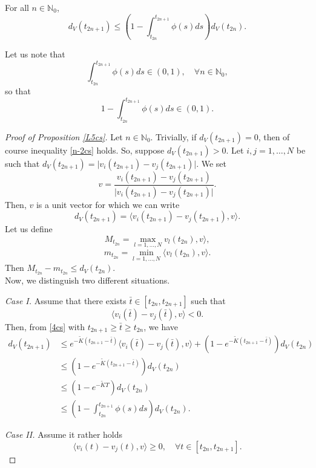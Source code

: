 \documentclass[a4paper,11pt,oneside]{article}
\begin{document}
\begin{prop}\label{L5cs}
	For all $n\in \mathbb{N}_{0}$, 
	\begin{equation}\label{n-2cs}
		d_{V}(t_{2n+1})\leq \left(1-\int_{t_{2n}}^{t_{2n+1}}\phi(s)ds\right)d_{V}(t_{2n}).
	\end{equation}
\end{prop}
\begin{oss}
	Let us note that $$\int_{t_{2n}}^{t_{2n+1}}\phi(s)ds\in (0,1),\quad \forall n\in \mathbb{N}_0,$$
	so that $$1-\int_{t_{2n}}^{t_{2n+1}}\phi(s)ds\in (0,1).$$
\end{oss}
\begin{proof}[Proof of Proposition \ref{L5cs}]
	Let $n\in \mathbb{N}_{0}$. Trivially, if $d_V(t_{2n+1})=0$, then of course inequality \eqref{n-2cs} holds. So, suppose $d_V(t_{2n+1})>0$. Let $i,j=1,\dots,N$ be such that $d_V(t_{2n+1})=\lvert v_{i}(t_{2n+1})-v_{j}(t_{2n+1})\rvert$. We set $$v=\frac{v_{i}(t_{2n+1})-v_{j}(t_{2n+1})}{\lvert v_{i}(t_{2n+1})-v_{j}(t_{2n+1})\rvert}.$$
	Then, $v$ is a unit vector for which we can write $$d_V(t_{2n+1})=\langle v_{i}(t_{2n+1})-v_{j}(t_{2n+1}),v\rangle.$$
	Let us define $$M_{t_{2n}}=\max_{l=1,\dots,N} v_{l}(t_{2n}),v\rangle,$$
	$$m_{t_{2n}}=\min_{l=1,\dots,N}\langle v_{l}(t_{2n}),v\rangle.$$
	Then $M_{t_{2n}}-m_{t_{2n}}\leq d_V(t_{2n})$. 
	\\Now, we distinguish two different situations.
	\par\textit{Case I.} Assume that there exists $\bar{t}\in [t_{2n},t_{2n+1}]$ such that 
	$$\langle v_{i}(\bar{t})-v_{j}(\bar{t}),v\rangle<0.$$
	Then, from \eqref{4cs} with $t_{2n+1}\geq \bar{t}\geq t_{2n}$, we have \begin{equation}\label{t0cs}
		\begin{split}
			d_V(t_{2n+1})&\leq e^{-\tilde K(t_{2n+1}-\bar{t})}\langle v_{i}(\bar{t})-v_{j}(\bar{t}),v\rangle+(1-e^{-\tilde K(t_{2n+1}-\bar{t})})d_V(t_{2n})\\&\leq (1-e^{-\tilde K(t_{2n+1}-\bar{t})})d_V(t_{2n})\\&\leq (1-e^{-\tilde KT})d_V(t_{2n})\\&\leq \left(1-\int_{t_{2n}}^{t_{2n+1}}\phi(s)ds\right)d_V(t_{2n}).
		\end{split}
	\end{equation}
	\par\textit{Case II.} Assume it rather holds \begin{equation}\label{poscs}
		\langle v_{i}(t)-v_{j}(t),v\rangle\geq 0,\quad \forall t\in [t_{2n},t_{2n+1}].
	\end{equation}

\end{proof}
\end{document}
